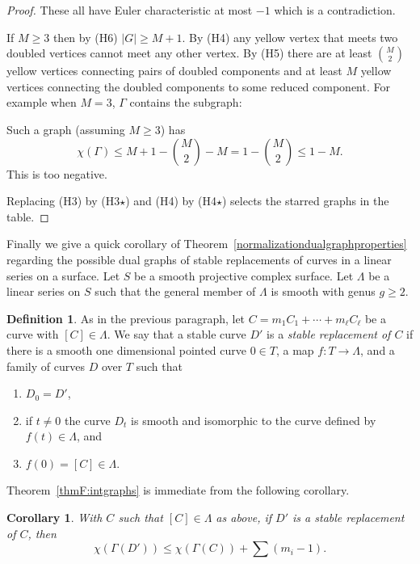 \documentclass[JEP,XML,SOM,Unicode,NoFloatCountersInSection,published]{cedram}
\theoremstyle{plain}
\newtheorem{corollary}[theorem]{Corollary}
\theoremstyle{definition}
\newtheorem{definition}[theorem]{Definition}
\newcommand\cl{{\colon}}
\begin{document}
\begin{proof}
\noindent These all have Euler characteristic at most $-1$ which is a contradiction.

If $M\ge 3$ then by (H6) $|G|\ge M+1$. By (H4) any yellow vertex that meets two doubled vertices cannot meet any other vertex. By (H5) there are at least $\binom{M}{2}$ yellow vertices connecting pairs of doubled components and at least $M$ yellow vertices connecting the doubled components to some reduced component. For example when $M=3$, $\Gamma$ contains the subgraph:
\begin{figure}[htb]
\centering
\scalebox{1.3}{}
\end{figure}
\noindent Such a graph (assuming $M\ge 3$) has
\[
\chi(\Gamma) \le M+1-\binom{M}{2}-M = 1-\binom{M}{2}\le 1-M.
\]
This is too negative.

Replacing (H3) by (H3$\star$) and (H4) by (H4$\star$) selects the starred graphs in the table.
\end{proof}


Finally we give a quick corollary of Theorem~\ref{normalizationdualgraphproperties} regarding the possible dual graphs of stable replacements of curves in a linear series on a surface. Let $S$ be a smooth projective complex surface. Let $\Lambda$ be a linear series on $S$ such that the general member of $\Lambda$ is smooth with genus $g\ge 2$.

\begin{definition}
As in the previous paragraph, let $C=m_1C_1+\cdots+m_\ell C_\ell$ be a curve with $[C]\in \Lambda$. We say that a stable curve $D'$ is a \textit{stable replacement of $C$} if there is a smooth one dimensional pointed curve $0\in T$, a map $f\cl T\to \Lambda$, and a family of curves $D$ over $T$ such that
\begin{enumerate}
\item $D_0 = D'$,
\item if $t\ne 0$ the curve $D_t$ is smooth and isomorphic to the curve defined by $f(t)\in \Lambda$, and
\item $f(0) = [C]\in \Lambda$.
\end{enumerate}
\end{definition}

Theorem~\ref{thmF:intgraphs} is immediate from the following corollary.

\begin{corollary}
With $C$ such that $[C]\in \Lambda$ as above, if $D'$ is a stable replacement of $C$, then
\[
\chi(\Gamma(D')) \le \chi(\Gamma(C))+\sum (m_i-1).
\]
\end{corollary}
\end{document}
